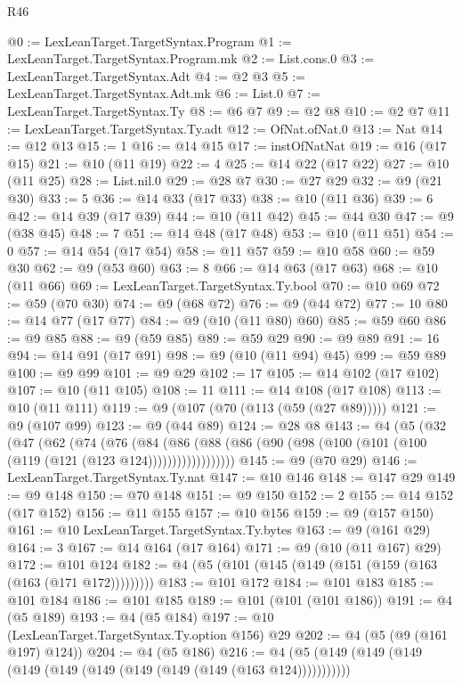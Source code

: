 \begin{lexlean}{R46}
\begin{coremodule}
@0 := LexLeanTarget.TargetSyntax.Program
@1 := LexLeanTarget.TargetSyntax.Program.mk
@2 := List.cons.{0}
@3 := LexLeanTarget.TargetSyntax.Adt
@4 := @2 @3
@5 := LexLeanTarget.TargetSyntax.Adt.mk
@6 := List.{0}
@7 := LexLeanTarget.TargetSyntax.Ty
@8 := @6 @7
@9 := @2 @8
@10 := @2 @7
@11 := LexLeanTarget.TargetSyntax.Ty.adt
@12 := OfNat.ofNat.{0}
@13 := Nat
@14 := @12 @13
@15 := 1
@16 := @14 @15
@17 := instOfNatNat
@19 := @16 (@17 @15)
@21 := @10 (@11 @19)
@22 := 4
@25 := @14 @22 (@17 @22)
@27 := @10 (@11 @25)
@28 := List.nil.{0}
@29 := @28 @7
@30 := @27 @29
@32 := @9 (@21 @30)
@33 := 5
@36 := @14 @33 (@17 @33)
@38 := @10 (@11 @36)
@39 := 6
@42 := @14 @39 (@17 @39)
@44 := @10 (@11 @42)
@45 := @44 @30
@47 := @9 (@38 @45)
@48 := 7
@51 := @14 @48 (@17 @48)
@53 := @10 (@11 @51)
@54 := 0
@57 := @14 @54 (@17 @54)
@58 := @11 @57
@59 := @10 @58
@60 := @59 @30
@62 := @9 (@53 @60)
@63 := 8
@66 := @14 @63 (@17 @63)
@68 := @10 (@11 @66)
@69 := LexLeanTarget.TargetSyntax.Ty.bool
@70 := @10 @69
@72 := @59 (@70 @30)
@74 := @9 (@68 @72)
@76 := @9 (@44 @72)
@77 := 10
@80 := @14 @77 (@17 @77)
@84 := @9 (@10 (@11 @80) @60)
@85 := @59 @60
@86 := @9 @85
@88 := @9 (@59 @85)
@89 := @59 @29
@90 := @9 @89
@91 := 16
@94 := @14 @91 (@17 @91)
@98 := @9 (@10 (@11 @94) @45)
@99 := @59 @89
@100 := @9 @99
@101 := @9 @29
@102 := 17
@105 := @14 @102 (@17 @102)
@107 := @10 (@11 @105)
@108 := 11
@111 := @14 @108 (@17 @108)
@113 := @10 (@11 @111)
@119 := @9 (@107 (@70 (@113 (@59 (@27 @89)))))
@121 := @9 (@107 @99)
@123 := @9 (@44 @89)
@124 := @28 @8
@143 := @4
    (@5
      (@32
        (@47
          (@62
            (@74
              (@76
                (@84
                  (@86
                    (@88 (@86 (@90 (@98 (@100 (@101 (@100 (@119 (@121 (@123 @124))))))))))))))))))
@145 := @9 (@70 @29)
@146 := LexLeanTarget.TargetSyntax.Ty.nat
@147 := @10 @146
@148 := @147 @29
@149 := @9 @148
@150 := @70 @148
@151 := @9 @150
@152 := 2
@155 := @14 @152 (@17 @152)
@156 := @11 @155
@157 := @10 @156
@159 := @9 (@157 @150)
@161 := @10 LexLeanTarget.TargetSyntax.Ty.bytes
@163 := @9 (@161 @29)
@164 := 3
@167 := @14 @164 (@17 @164)
@171 := @9 (@10 (@11 @167) @29)
@172 := @101 @124
@182 := @4 (@5 (@101 (@145 (@149 (@151 (@159 (@163 (@163 (@171 @172)))))))))
@183 := @101 @172
@184 := @101 @183
@185 := @101 @184
@186 := @101 @185
@189 := @101 (@101 (@101 @186))
@191 := @4 (@5 @189)
@193 := @4 (@5 @184)
@197 := @10 (LexLeanTarget.TargetSyntax.Ty.option @156) @29
@202 := @4 (@5 (@9 (@161 @197) @124))
@204 := @4 (@5 @186)
@216 := @4 (@5 (@149 (@149 (@149 (@149 (@149 (@149 (@149 (@149 (@149 (@163 @124)))))))))))

\end{coremodule}
\end{lexlean}
